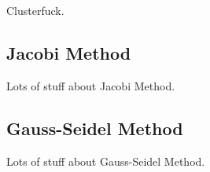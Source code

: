 
Clusterfuck.

\subsection{Jacobi Method}

Lots of stuff about Jacobi Method.

\subsection{Gauss-Seidel Method}

Lots of stuff about Gauss-Seidel Method.
